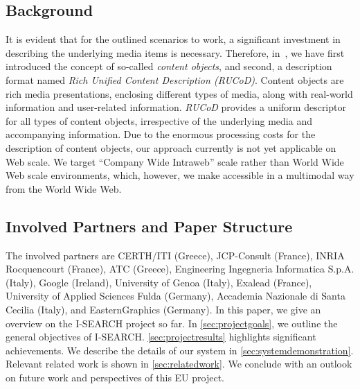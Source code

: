 \documentclass{www2012-comp-accepted}
\let\oldemph\emph
\renewcommand{\emph}[1]{\oldemph{\fontsize{9}{9}\selectfont #1}}
\begin{document}
\subsection{Background}
It is evident that for the outlined scenarios to work, a significant investment in describing the underlying media items is necessary.
Therefore, in~\cite{ijmis2010}, we have first introduced the concept of so-called \emph{content objects}, and second, a description format named \emph{Rich Unified Content Description \mbox{(RUCoD)}}.
Content objects are rich media presentations, enclosing different types of media, along with real-world information and user-related information.
\mbox{\emph{RUCoD}} provides a uniform descriptor for all types of content objects, irrespective of the underlying media and accompanying information.
Due to the enormous processing costs for the description of content objects,
our approach currently is not yet applicable on Web scale.
We target ``Company Wide Intraweb'' scale rather than World Wide Web scale environments,
which, however, we make accessible in a multimodal way from the World Wide Web.

\subsection{Involved Partners and Paper Structure}
The involved partners are CERTH/ITI (Greece), JCP-Consult (France), INRIA Rocquencourt (France), ATC (Greece), Engineering Ingegneria Informatica S.p.A. (Italy), Google (Ireland), University of Genoa (Italy), Exalead (France), University of Applied Sciences Fulda (Germany), Accademia Nazionale di Santa Cecilia (Italy), and EasternGraphics (Germany).
In this paper, we give an overview on the \mbox{I-SEARCH} project so far.
In \autoref{sec:projectgoals}, we outline the general objectives of  \mbox{I-SEARCH}.
\autoref{sec:projectresults} highlights significant achievements.
We describe the details of our system in \autoref{sec:systemdemonstration}.
Relevant related work is shown in \autoref{sec:relatedwork}.
We conclude with an outlook on future work and perspectives of this EU project.
\end{document}
